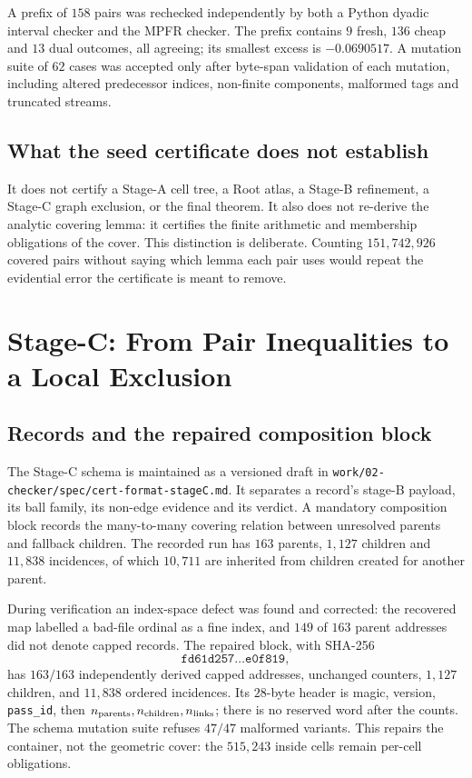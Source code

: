 \documentclass[10pt]{article}
\theoremstyle{definition}
\begin{document}
A prefix of $158$ pairs was rechecked independently by both a Python dyadic interval checker and the MPFR checker. The prefix contains $9$ fresh, $136$ cheap and $13$ dual outcomes, all agreeing; its smallest excess is $-0.0690517$. A mutation suite of $62$ cases was accepted only after byte-span validation of each mutation, including altered predecessor indices, non-finite components, malformed tags and truncated streams.

\subsection{What the seed certificate does not establish}

It does not certify a Stage-A cell tree, a Root atlas, a Stage-B refinement, a Stage-C graph exclusion, or the final theorem. It also does not re-derive the analytic covering lemma: it certifies the finite arithmetic and membership obligations of the cover. This distinction is deliberate. Counting $151{,}742{,}926$ covered pairs without saying which lemma each pair uses would repeat the evidential error the certificate is meant to remove.

\section{Stage-C: From Pair Inequalities to a Local Exclusion}
\label{sec:stagec}

\subsection{Records and the repaired composition block}

The Stage-C schema is maintained as a versioned draft in \texttt{work/02-checker/spec/cert-format-stageC.md}. It separates a record's stage-B payload, its ball family, its non-edge evidence and its verdict. A mandatory composition block records the many-to-many covering relation between unresolved parents and fallback children. The recorded run has $163$ parents, $1{,}127$ children and $11{,}838$ incidences, of which $10{,}711$ are inherited from children created for another parent.

During verification an index-space defect was found and corrected: the recovered map labelled a bad-file ordinal as a fine index, and $149$ of $163$ parent addresses did not denote capped records. The repaired block, with SHA-256
\[
\texttt{fd61d257\ldots e0f819},
\]
has $163/163$ independently derived capped addresses, unchanged counters, $1{,}127$ children, and $11{,}838$ ordered incidences. Its $28$-byte header is magic, version, \texttt{pass\_id}, then $n_{\rm parents},n_{\rm children},n_{\rm links}$; there is no reserved word after the counts. The schema mutation suite refuses $47/47$ malformed variants. This repairs the container, not the geometric cover: the $515{,}243$ inside cells remain per-cell obligations.
\end{document}
